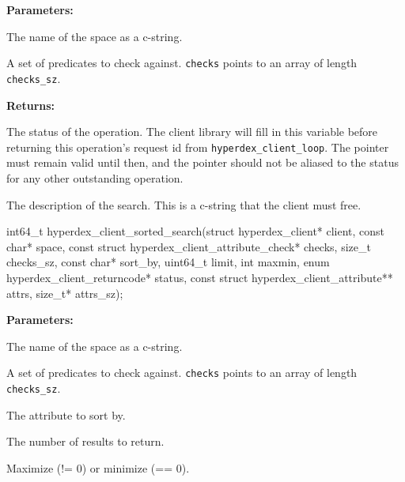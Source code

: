 \noindent\textbf{Parameters:}
\begin{description}[labelindent=\widthof{{\texttt{checks}, \texttt{checks\_sz}}},leftmargin=*,noitemsep,nolistsep,align=right]
\item[\texttt{space}] The name of the space as a c-string.
\item[\texttt{checks}, \texttt{checks\_sz}] A set of predicates to check against.  \texttt{checks} points to an array of length \texttt{checks\_sz}.
\end{description}

\noindent\textbf{Returns:}
\begin{description}[labelindent=\widthof{{\texttt{description}}},leftmargin=*,noitemsep,nolistsep,align=right]
\item[\texttt{status}] The status of the operation.  The client library will fill in this variable before returning this operation's request id from \texttt{hyperdex\_client\_loop}.  The pointer must remain valid until then, and the pointer should not be aliased to the status for any other outstanding operation.
\item[\texttt{description}] The description of the search.  This is a c-string that the client must free.
\end{description}

\funcsep
{}
\begin{ccode}
int64_t hyperdex_client_sorted_search(struct hyperdex_client* client,
                const char* space,
                const struct hyperdex_client_attribute_check* checks, size_t checks_sz,
                const char* sort_by,
                uint64_t limit,
                int maxmin,
                enum hyperdex_client_returncode* status,
                const struct hyperdex_client_attribute** attrs, size_t* attrs_sz);
\end{ccode}
\funcdesc 

\noindent\textbf{Parameters:}
\begin{description}[labelindent=\widthof{{\texttt{checks}, \texttt{checks\_sz}}},leftmargin=*,noitemsep,nolistsep,align=right]
\item[\texttt{space}] The name of the space as a c-string.
\item[\texttt{checks}, \texttt{checks\_sz}] A set of predicates to check against.  \texttt{checks} points to an array of length \texttt{checks\_sz}.
\item[\texttt{sort\_by}] The attribute to sort by.
\item[\texttt{limit}] The number of results to return.
\item[\texttt{maxmin}] Maximize (!= 0) or minimize (== 0).
\end{description}

